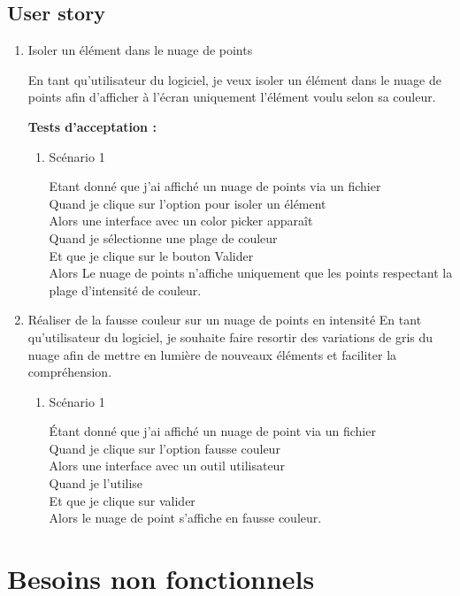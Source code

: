 \documentclass[12pt,titlepage,french]{article}
\begin{document}
\subsection*{User story}

\begin{enumerate}
    \item Isoler un élément dans le nuage de points
    
En tant qu'utilisateur du logiciel, je veux isoler un élément dans le nuage de points afin d'afficher à l'écran uniquement l'élément voulu selon sa couleur.

\textbf{Tests d'acceptation :}

\begin{enumerate}
    \item Scénario 1
    
Etant donné que j'ai affiché un nuage de points via un fichier\\
Quand je clique sur l'option pour isoler un élément\\
Alors une interface avec un color picker apparaît\\
Quand je sélectionne une plage de couleur\\
Et que je clique sur le bouton Valider\\
Alors Le nuage de points n'affiche uniquement que les points respectant la plage d'intensité de couleur.


\end{enumerate}
\item Réaliser de la fausse couleur sur un nuage de points en intensité
En tant qu'utilisateur du logiciel, je souhaite faire resortir des variations de gris du nuage afin de mettre en lumière de nouveaux éléments et faciliter la compréhension.
\begin{enumerate}
    \item Scénario 1
    
Étant donné que j'ai affiché un nuage de point via un fichier\\
Quand je clique sur l'option fausse couleur\\
Alors une interface avec un outil utilisateur\\
Quand je l'utilise\\
Et que je clique sur valider\\
Alors le nuage de point s'affiche en fausse couleur.
\end{enumerate}
\end{enumerate}


\section{Besoins non fonctionnels}
\end{document}

